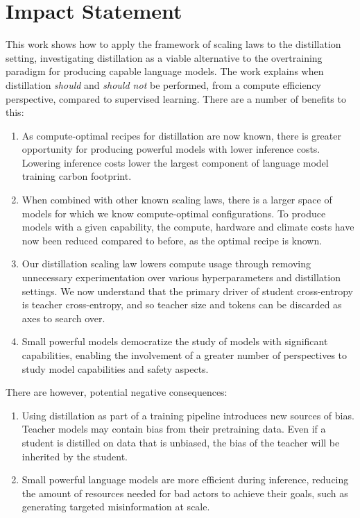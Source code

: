 \section*{Impact Statement}
\label{sec:impact-statement}

This work shows how to apply the framework of scaling laws to the distillation setting,
investigating distillation as a viable alternative to the overtraining paradigm for producing 
capable language models.
The work explains when distillation \emph{should} and \emph{should not} be performed, from a compute efficiency perspective, compared to supervised learning.
There are a number of benefits to this:
\begin{enumerate}
    \item As compute-optimal recipes for distillation are now known, there is greater opportunity for producing powerful models with lower inference costs.
    Lowering inference costs lower the largest component of language model training carbon footprint.
    \item When combined with other known scaling laws, there is a larger space of models for which we know compute-optimal configurations. 
    To produce models with a given capability, the compute, hardware and climate costs have now been reduced compared to before, as the optimal recipe is known.
    \item Our distillation scaling law lowers compute usage through removing unnecessary experimentation over various hyperparameters and distillation settings. We now understand that the primary driver of student cross-entropy is teacher cross-entropy, and so teacher size and tokens can be discarded as axes to search over.
    \item Small powerful models democratize the study of models with significant capabilities, enabling the involvement of a greater number of perspectives to study
    model capabilities and safety aspects.
\end{enumerate}
There are however, potential negative consequences:
\begin{enumerate}
    \item Using distillation as part of a training pipeline introduces new sources of bias. Teacher models may contain bias from their pretraining data. Even if a student is distilled on data that is unbiased, the bias of the teacher will be inherited by the student.
    \item Small powerful language models are more efficient during inference, reducing the amount of resources needed for bad actors to achieve their goals, such as generating targeted misinformation at scale.
\end{enumerate}
